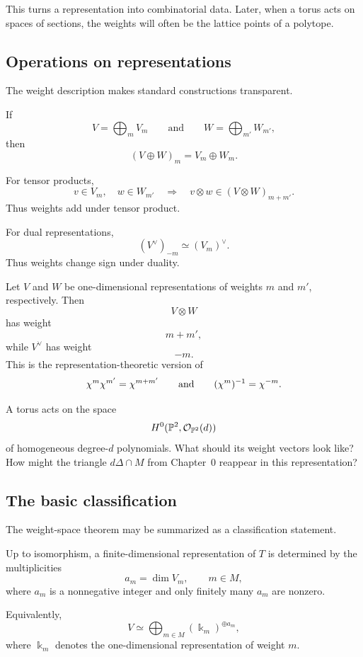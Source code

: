 This turns a representation into combinatorial data. Later, when a
torus acts on spaces of sections, the weights will often be the lattice
points of a polytope.

\subsection{Operations on representations}

The weight description makes standard constructions transparent.

If
\[
V=\bigoplus_m V_m
\qquad\text{and}\qquad
W=\bigoplus_{m'}W_{m'},
\]
then
\[
(V\oplus W)_m
=
V_m\oplus W_m.
\]

For tensor products,
\[
v\in V_m,\quad w\in W_{m'}
\quad\Longrightarrow\quad
v\otimes w\in(V\otimes W)_{m+m'}.
\]
Thus weights add under tensor product.

For dual representations,
\[
(V^\vee)_{-m}
\simeq
(V_m)^\vee.
\]
Thus weights change sign under duality.

\begin{example}
Let \(V\) and \(W\) be one-dimensional representations of weights
\(m\) and \(m'\), respectively. Then
\[
V\otimes W
\]
has weight
\[
m+m',
\]
while \(V^\vee\) has weight
\[
-m.
\]
This is the representation-theoretic version of
\[
\chi^{m}\chi^{m'}=\chi^{m+m'}
\qquad\text{and}\qquad
(\chi^{m})^{-1}=\chi^{-m}.
\]
\end{example}

\begin{prediction}
A torus acts on the space
\[
H^0(\mathbb{P}^2,\mathcal{O}_{\mathbb{P}^2}(d))
\]
of homogeneous degree-\(d\) polynomials. What should its weight vectors
look like? How might the triangle \(d\Delta\cap M\) from Chapter~0
reappear in this representation?
\end{prediction}

\subsection{The basic classification}

The weight-space theorem may be summarized as a classification
statement.

\begin{theorem}
Up to isomorphism, a finite-dimensional representation of \(T\) is
determined by the multiplicities
\[
a_m=\dim V_m,
\qquad
m\in M,
\]
where \(a_m\) is a nonnegative integer and only finitely many \(a_m\)
are nonzero.

Equivalently,
\[
V
\simeq
\bigoplus_{m\in M}
\left(\Bbbk_m\right)^{\oplus a_m},
\]
where \(\Bbbk_m\) denotes the one-dimensional representation of
weight \(m\).
\end{theorem}

